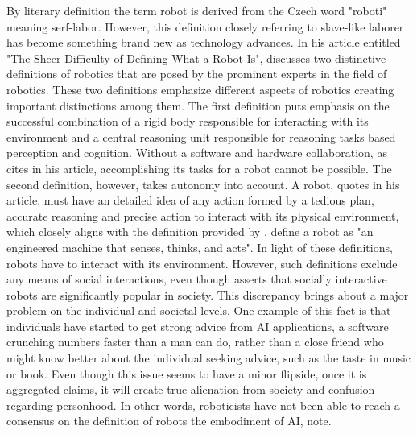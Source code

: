\documentclass[man]{apa6}
\begin{document}
By literary definition the term robot is derived from the Czech word "roboti" meaning serf-labor. 
However, this definition closely referring to slave-like laborer has become something brand new as technology advances.
In his article entitled "The Sheer Difficulty of Defining What a Robot Is",  discusses two distinctive definitions of robotics that are posed by the prominent experts in the field of robotics.
These two definitions emphasize different aspects of robotics creating important distinctions among them.
The first definition puts emphasis on the successful combination of a rigid body responsible for interacting with its environment and a central reasoning unit responsible for reasoning tasks based perception and cognition.
Without a software and hardware collaboration, as  cites in his article, accomplishing its tasks for a robot cannot be possible.
The second definition, however, takes autonomy into account.
A robot,  quotes in his article, must have an detailed idea of any action formed by a tedious plan, accurate reasoning and precise action to interact with its physical environment, which closely aligns with the definition provided by \cite{lin}. 
\citeauthor{lin} \citeyear[p.~943]{lin} define a robot as "an engineered machine that senses, thinks, and acts".
In light of these definitions, robots have to interact with its environment. However, such definitions exclude any means of social interactions, even though  asserts that socially interactive robots are significantly popular in society.
This discrepancy brings about a major problem on the individual and societal levels.
One example of this fact is that individuals have started to get strong advice from AI applications, a software crunching numbers faster than a man can do, rather than a close friend who might know better about the individual seeking advice, such as the taste in music or book.
Even though this issue seems to have a minor flipside, once it is aggregated  claims, it will create true alienation from society and confusion regarding personhood.
In other words, roboticists have not been able  to reach a consensus on the definition of robots the embodiment of AI,  note.
\par
\end{document}
